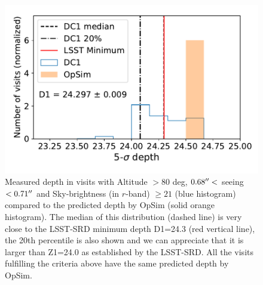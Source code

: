\documentclass[a4paper,fleqn,usenatbib]{mnras}
\begin{document}
\begin{figure}
\centering
\includegraphics[width=0.85\columnwidth]{m5_goals}
\caption{Measured depth in visits with Altitude $>80$ deg, $0.68 \hbox{$^{\prime\prime}$} <$ seeing $ < 0.71 \hbox{$^{\prime\prime}$}$ and Sky-brightness (in $r$-band) $\geq 21$ (blue histogram) compared to the predicted depth by OpSim (solid orange histogram). The median of this distribution (dashed line) is very close to the LSST-SRD minimum depth D1=24.3 (red vertical line), the 20th percentile is also shown and we can appreciate that it is larger than Z1=24.0 as established by the LSST-SRD. All the visits fulfilling the criteria above have the same predicted depth by OpSim.}
\label{fig:DF1_checks}
\end{figure}
\end{document}
